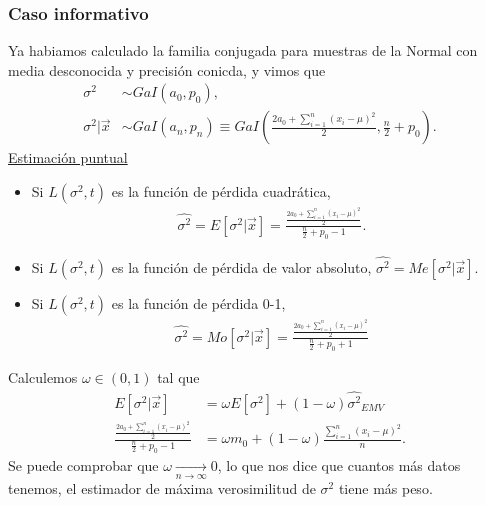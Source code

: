 \subsubsection{Caso informativo}
Ya habiamos calculado la familia conjugada para muestras de la Normal con media desconocida y precisión conicda, y vimos que
\begin{align*}
    \sigma^2           & \sim GaI(a_0,p_0),                                                                                         \\
    \sigma^2 | \vec{x} & \sim GaI(a_n,p_n) \equiv GaI\left(\frac{2a_0 + \sum_{i=1}^{n} (x_i- \mu)^2}{2}, \frac{n}{2} + p_0 \right).
\end{align*}
\underline{Estimación puntual}
\begin{itemize}
    \item Si $L(\sigma^2,t)$ es la función de pérdida cuadrática,
          \begin{align*}
              \widehat{\sigma^2} = E[\sigma^2 |  \vec{x}] = \frac{\frac{2a_0 + \sum_{i=1}^{n} (x_i- \mu)^2}{2}}{\frac{n}{2} + p_0-1}.
          \end{align*}
    \item Si $L(\sigma^2,t)$ es la función de pérdida de valor absoluto, $\widehat{\sigma^2} = Me[\sigma^2 |  \vec{x}]$.
    \item Si $L(\sigma^2,t)$ es la función de pérdida 0-1,
          \begin{align*}
              \widehat{\sigma^2} = Mo[\sigma^2 |  \vec{x}] =  \frac{\frac{2a_0 + \sum_{i=1}^{n} (x_i- \mu)^2}{2}}{\frac{n}{2} + p_0+1}
          \end{align*}
\end{itemize}
Calculemos $\omega \in (0,1)$ tal que
\begin{align*}
    E[\sigma^2  | \vec{x}]                                                   & = \omega E[\sigma^2]  + (1 - \omega) \widehat{\sigma^2 }_{EMV}    \\
    \frac{\frac{2a_0 + \sum_{i=1}^{n} (x_i- \mu)^2}{2}}{\frac{n}{2} + p_0-1} & = \omega m_0 + (1-\omega) \frac{\sum_{i=1}^{n}{(x_i -\mu)^2}}{n}.
\end{align*}
Se puede comprobar que $\omega \xrightarrow[n \to \infty]{} 0$, lo que nos dice que cuantos más datos tenemos, el estimador de máxima verosimilitud de $\sigma^2$ tiene más peso.

